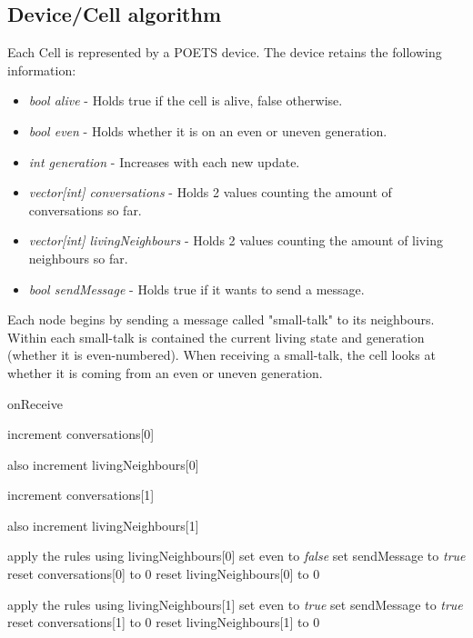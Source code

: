 \documentclass[a4paper]{article}
\begin{document}
\subsection*{Device/Cell algorithm}
Each Cell is represented by a POETS device. The device retains the following information:
\begin{itemize}
    \item \emph{bool alive} - Holds true if the cell is alive, false otherwise.
    \item \emph{bool even} - Holds whether it is on an even or uneven generation.
    \item \emph{int generation} - Increases with each new update.
    \item \emph{vector[int] conversations} - Holds 2 values counting the amount of conversations so far.
    \item \emph{vector[int] livingNeighbours} - Holds 2 values counting the amount of living neighbours so far.
    \item \emph{bool sendMessage} - Holds true if it wants to send a message.
\end{itemize}

Each node begins by sending a message called "small-talk" to its neighbours. Within each small-talk is contained the current living state and generation (whether it is even-numbered).
When receiving a small-talk, the cell looks at whether it is coming from an even or uneven generation.

\begin{algorithm}
\caption{onReceive}
\State increment conversations[0]

also increment livingNeighbours[0]
\EndIf

\Else 
\State increment conversations[1]

also increment livingNeighbours[1]
\EndIf

\EndIf

\State

\State apply the rules using livingNeighbours[0]
\State set even to \emph{false}
\State set sendMessage to \emph{true}
\State reset conversations[0] to 0
\State reset livingNeighbours[0] to 0
\EndIf

\State apply the rules using livingNeighbours[1]
\State set even to \emph{true}
\State set sendMessage to \emph{true}
\State reset conversations[1] to 0
\State reset livingNeighbours[1] to 0
\EndIf
\end{algorithm}
\end{document}
